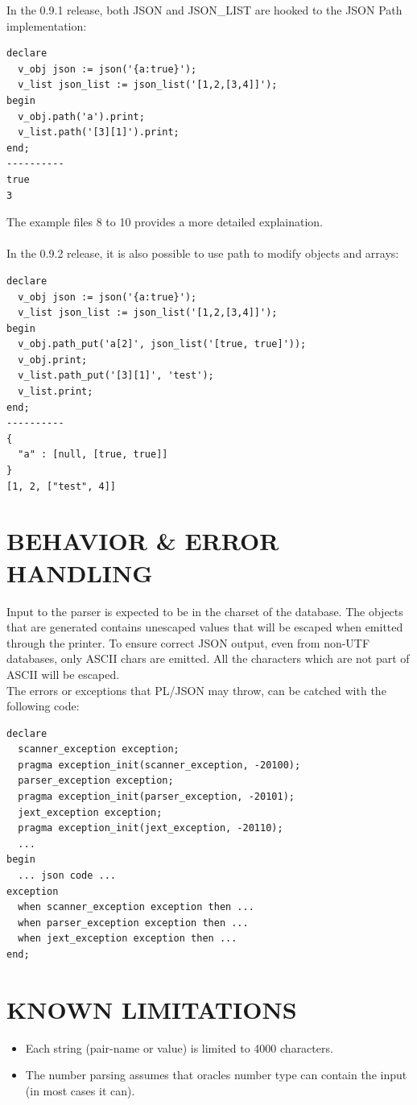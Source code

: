 \documentclass[11pt,a4paper]{article}
\begin{document}
In the 0.9.1 release, both JSON and JSON\_LIST are hooked to the JSON Path implementation:
\begin{verbatim}
declare
  v_obj json := json('{a:true}');
  v_list json_list := json_list('[1,2,[3,4]]');
begin
  v_obj.path('a').print;
  v_list.path('[3][1]').print;
end;
----------
true
3
\end{verbatim}
The example files 8 to 10 provides a more detailed explaination.\\
\\
In the 0.9.2 release, it is also possible to use path to modify objects and arrays:
\begin{verbatim}
declare
  v_obj json := json('{a:true}');
  v_list json_list := json_list('[1,2,[3,4]]');
begin
  v_obj.path_put('a[2]', json_list('[true, true]'));
  v_obj.print;
  v_list.path_put('[3][1]', 'test');
  v_list.print;
end;
----------
{
  "a" : [null, [true, true]]
}
[1, 2, ["test", 4]]
\end{verbatim}

\section{BEHAVIOR \& ERROR HANDLING}
Input to the parser is expected to be in the charset of the database. The objects that are generated contains unescaped values that will be escaped when emitted through the printer. To ensure correct JSON output, even from non-UTF databases, only ASCII chars are emitted. All the characters which are not part of ASCII will be escaped. 
\\
The errors or exceptions that PL/JSON may throw, can be catched with the following code:
\begin{verbatim}
declare
  scanner_exception exception;
  pragma exception_init(scanner_exception, -20100);
  parser_exception exception;
  pragma exception_init(parser_exception, -20101);
  jext_exception exception;
  pragma exception_init(jext_exception, -20110);
  ...
begin
  ... json code ...
exception
  when scanner_exception exception then ...
  when parser_exception exception then ...
  when jext_exception exception then ...
end;
\end{verbatim}

\section{KNOWN LIMITATIONS}
\begin{itemize}
\item Each string (pair-name or value) is limited to 4000 characters.
\item The number parsing assumes that oracles number type can contain the input (in most cases it can).
\end {itemize}
\end{document}
